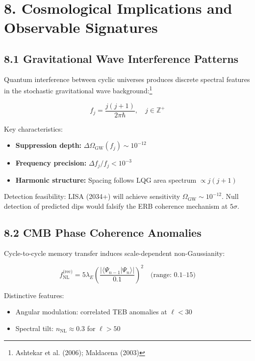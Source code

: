 \section*{8. Cosmological Implications and Observable Signatures}

\subsection*{8.1 Gravitational Wave Interference Patterns}

Quantum interference between cyclic universes produces discrete spectral features in the stochastic gravitational wave background:\footnote{Ashtekar et al. (2006)\cite{ashtekar2006quantum}; Maldacena (2003)\cite{maldacena2003eternal}}

\[
f_j = \frac{j(j+1)}{2\pi\hbar}, \quad j \in \mathbb{Z}^+
\]

Key characteristics:
\begin{itemize}
  \item \textbf{Suppression depth:} $\Delta \Omega_{\text{GW}}(f_j) \sim 10^{-12}$
  \item \textbf{Frequency precision:} $\Delta f_j / f_j < 10^{-3}$
  \item \textbf{Harmonic structure:} Spacing follows LQG area spectrum $\propto j(j+1)$\cite{rovelli2004quantum}
\end{itemize}

Detection feasibility: LISA (2034+) will achieve sensitivity $\Omega_{\text{GW}} \sim 10^{-12}$\cite{amaroseoane2017laser}. Null detection of predicted dips would falsify the ERB coherence mechanism at $5\sigma$.

\subsection*{8.2 CMB Phase Coherence Anomalies}

Cycle-to-cycle memory transfer induces scale-dependent non-Gaussianity:\cite{zurek2009quantum}

\[
f_{\text{NL}}^{\text{(rec)}} = 5\lambda_E \left( \frac{|\langle \Psi_{n-1} | \Psi_n \rangle|}{0.1} \right)^2 \quad \text{(range: 0.1--15)}
\]

Distinctive features:
\begin{itemize}
  \item Angular modulation: correlated TEB anomalies at $\ell < 30$
  \item Spectral tilt: $n_{\text{NL}} \approx 0.3$ for $\ell > 50$
\end{itemize}

